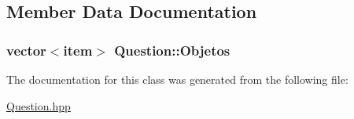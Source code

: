 \subsection{Member Data Documentation}
\hypertarget{class_question_aee4dca57403e91e0f2062499ba2955a9}{
\subsubsection[{Objetos}]{\setlength{\rightskip}{0pt plus 5cm}vector$<${\bf item}$>$ Question\+::\+Objetos\hspace{0.3cm}{\ttfamily [protected]}}}\label{class_question_aee4dca57403e91e0f2062499ba2955a9}


The documentation for this class was generated from the following file\+:\begin{DoxyCompactItemize}
\item 
\hyperlink{_question_8hpp}{Question.\+hpp}\end{DoxyCompactItemize}

